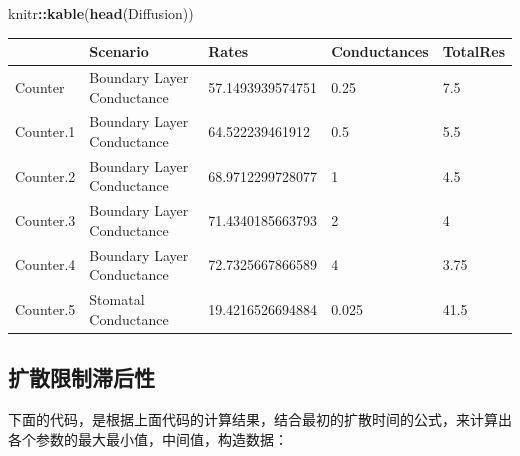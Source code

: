 \documentclass[
]{krantz}
\makeatletter
\newenvironment{Shaded}{\begin{snugshade}}{\end{snugshade}}
\newcommand{\KeywordTok}[1]{\textcolor[rgb]{0.13,0.29,0.53}{\textbf{#1}}}
\newcommand{\NormalTok}[1]{#1}
\newcommand{\OperatorTok}[1]{\textcolor[rgb]{0.81,0.36,0.00}{\textbf{#1}}}
\newenvironment{kframe}{%
\medskip{}
\setlength{\fboxsep}{.8em}
 \def\at@end@of@kframe{}%
 \ifinner\ifhmode%
  \def\at@end@of@kframe{\end{minipage}}%
  \begin{minipage}{\columnwidth}%
 \fi\fi%
 \def\FrameCommand##1{\hskip\@totalleftmargin \hskip-\fboxsep
 \colorbox{shadecolor}{##1}\hskip-\fboxsep
     \hskip-\linewidth \hskip-\@totalleftmargin \hskip\columnwidth}%
 \MakeFramed {\advance\hsize-\width
   \@totalleftmargin\z@ \linewidth\hsize
   \@setminipage}}%
 {\par\unskip\endMakeFramed%
 \at@end@of@kframe}
\renewenvironment{Shaded}{\begin{kframe}}{\end{kframe}}
\makeatother
\begin{document}
\begin{Shaded}
\begin{Highlighting}[]
\NormalTok{knitr}\OperatorTok{::}\KeywordTok{kable}\NormalTok{(}\KeywordTok{head}\NormalTok{(Diffusion))}
\end{Highlighting}
\end{Shaded}

\begin{tabular}{l|l|l|l|l}
\hline
  & Scenario & Rates & Conductances & TotalRes\\
\hline
Counter & Boundary Layer Conductance & 57.1493939574751 & 0.25 & 7.5\\
\hline
Counter.1 & Boundary Layer Conductance & 64.522239461912 & 0.5 & 5.5\\
\hline
Counter.2 & Boundary Layer Conductance & 68.9712299728077 & 1 & 4.5\\
\hline
Counter.3 & Boundary Layer Conductance & 71.4340185663793 & 2 & 4\\
\hline
Counter.4 & Boundary Layer Conductance & 72.7325667866589 & 4 & 3.75\\
\hline
Counter.5 & Stomatal Conductance & 19.4216526694884 & 0.025 & 41.5\\
\hline
\end{tabular}

\hypertarget{difu-limit}{%
\subsection{扩散限制滞后性}\label{difu-limit}}

下面的代码，是根据上面代码的计算结果，结合最初的扩散时间的公式，来计算出各个参数的最大最小值，中间值，构造数据：
\end{document}
